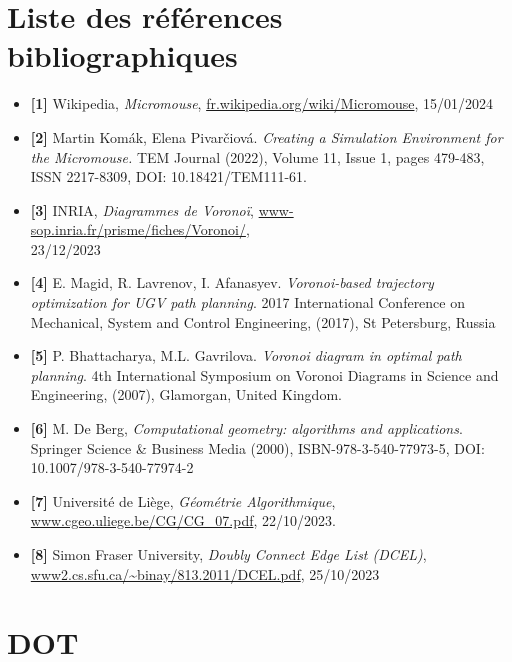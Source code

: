 \documentclass[a4paper]{article}
\begin{document}
\section*{Liste des références bibliographiques}
\begin{itemize}
    \item \textbf{[1]} \quad Wikipedia, \textit{Micromouse}, \url{fr.wikipedia.org/wiki/Micromouse}, 15/01/2024
    \item \textbf{[2]} \quad Martin Komák, Elena Pivarčiová.\textit{ Creating a Simulation Environment for the Micromouse.} TEM Journal (2022), Volume 11, Issue 1, pages 479-{483}, ISSN 2217-{8309}, {DOI}: 10.18421/TEM111-{61}.
    \item \textbf{[3]} \quad INRIA, \textit{Diagrammes de Voronoï}, \url{www-sop.inria.fr/prisme/fiches/Voronoi/},\\ 23/12/2023
    \item \textbf{[4]} \quad E. Magid, R. Lavrenov, I. Afanasyev.\textit{ Voronoi-based trajectory optimization for UGV path planning}. 2017 International Conference on Mechanical, System and Control Engineering, (2017), St Petersburg, Russia
    \item \textbf{[5]} \quad P. Bhattacharya, M.L. Gavrilova.\textit{ Voronoi diagram in optimal path planning}. 4th International Symposium on Voronoi Diagrams in Science and Engineering, (2007), Glamorgan, United Kingdom.
    \item \textbf{[6]} \quad M. De Berg, \textit{ Computational geometry: algorithms and applications}. Springer Science \& Business Media (2000), ISBN-{978}-{3}-{540}-{77973}-5, {DOI}: 10.1007/{978}-{3}-{540}-{77974}-2
    \item \textbf{[7]} \quad Université de Liège, \textit{Géométrie Algorithmique}, \url{www.cgeo.uliege.be/CG/CG_07.pdf}, 22/10/2023.
    \item \textbf{[8]} \quad Simon Fraser University, \textit{Doubly Connect Edge List (DCEL)}, \url{www2.cs.sfu.ca/~binay/813.2011/DCEL.pdf}, 25/10/2023
\end{itemize}


\section*{DOT}
\end{document}
